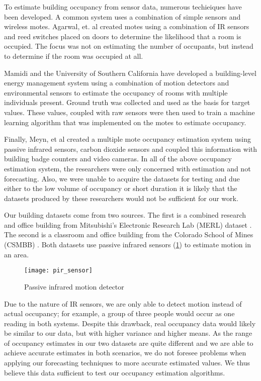 To estimate building occupancy from sensor data, numerous techieiques have been developed.  A common system uses a combination of simple sensors and wireless motes.  Agarwal, et. al \cite{agarwal2010} created motes using a combination of IR sensors and reed switches placed on doors to determine the likelihood that a room is occupied.  The focus was not on estimating the number of occupants, but instead to determine if the room was occupied at all.  

Mamidi \cite{mamidi2012} and the University of Southern California have developed a building-level energy management system using a combination of motion detectors and environmental sensors to estimate the occupancy of rooms with multiple individuals present.  Ground truth was collected and used as the basis for target values.  These values, coupled with raw sensors were then used to train a machine learning algorithm that was implemented on the motes to estimate occupancy.

Finally, Meyn, et al \cite{meyn2009} created a multiple mote occupancy estimation system using passive infrared sensors, carbon dioxide sensors and coupled this information with building badge counters and video cameras.  In all of the above occupancy estimation system, the researchers were only concerned with estimation and not forecasting.  Also, we were unable to acquire the datasets for testing and due either to the low volume of occupancy or short duration it is likely that the datasets produced by these researchers would not be sufficient for our work.

Our building datasets come from two sources.  The first is a combined research and office building from Mitsubishi's Electronic Research Lab (MERL) dataset \cite{Wren2007}.  The second is a classroom and office building from the Colorado School of Mines (CSMBB) \cite{Hoff2009, Howard2013}.  Both datasets use passive infrared sensors (\ref{fig:pirsensor}) to estimate motion in an area.  

\begin{figure}[h]
	\begin{center}
		\texttt{[image: pir\_sensor]}
	\end{center}
	\caption{Passive infrared motion detector}
	\label{fig:pirsensor}
\end{figure}

Due to the nature of IR sensors, we are only able to detect motion instead of actual occupancy; for example, a group of three people would occur as one reading in both systems.  Despite this drawback, real occupancy data would likely be similar to our data, but with higher variance and higher means.  As the range of occupancy estimates in our two datasets are quite different and we are able to achieve accurate estimates in both scenarios, we do not foresee problems when applying our forecasting techniques to more accurate estimated values.  We thus believe this data sufficient to test our occupancy estimation algorithms.

